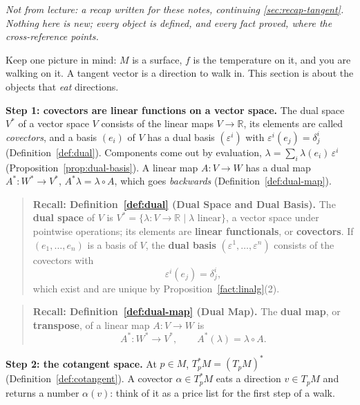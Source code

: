 \documentclass[11pt]{report}
\begin{document}
\textit{Not from lecture: a recap written for these notes, continuing \ref{sec:recap-tangent}. Nothing here is new; every object is defined, and every fact proved, where the cross-reference points.}

Keep one picture in mind: $M$ is a surface, $f$ is the temperature on it, and you are walking on it. A tangent vector is a direction to walk in. This section is about the objects that \emph{eat} directions.

\textbf{Step 1: covectors are linear functions on a vector space.} The dual space $V^*$ of a vector space $V$ consists of the linear maps $V \to \mathbb{R}$, its elements are called \emph{covectors}, and a basis $(e_i)$ of $V$ has a dual basis $(\varepsilon^i)$ with $\varepsilon^i(e_j) = \delta^i_j$ (Definition~\ref{def:dual}). Components come out by evaluation, $\lambda = \sum_i \lambda(e_i)\, \varepsilon^i$ (Proposition~\ref{prop:dual-basis}). A linear map $A : V \to W$ has a dual map $A^* : W^* \to V^*$, $A^*\lambda = \lambda \circ A$, which goes \emph{backwards} (Definition~\ref{def:dual-map}).

\begin{quote}
\textbf{Recall: Definition~\ref{def:dual} (Dual Space and Dual Basis).} The \textbf{dual space} of $V$ is $V^* = \{\lambda : V \to \mathbb{R} \mid \lambda \text{ linear}\}$, a vector space under pointwise operations; its elements are \textbf{linear functionals}, or \textbf{covectors}. If $(e_1, \ldots, e_n)$ is a basis of $V$, the \textbf{dual basis} $(\varepsilon^1, \ldots, \varepsilon^n)$ consists of the covectors with
\[
\varepsilon^i(e_j) = \delta^i_j ,
\]
which exist and are unique by Proposition~\ref{fact:linalg}(2).
\end{quote}

\begin{quote}
\textbf{Recall: Definition~\ref{def:dual-map} (Dual Map).} The \textbf{dual map}, or \textbf{transpose}, of a linear map $A : V \to W$ is
\[
A^* : W^* \to V^*, \qquad A^*(\lambda) = \lambda \circ A .
\]
\end{quote}

\textbf{Step 2: the cotangent space.} At $p \in M$, $T_p^*M = (T_pM)^*$ (Definition~\ref{def:cotangent}). A covector $\alpha \in T_p^*M$ eats a direction $v \in T_pM$ and returns a number $\alpha(v)$: think of it as a price list for the first step of a walk.
\end{document}
